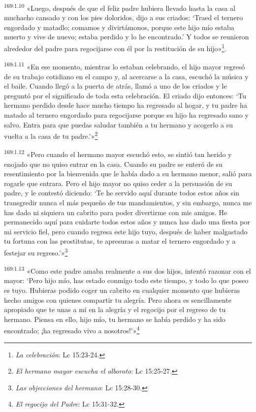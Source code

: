 \par
\textsuperscript{169:1.10} «Luego, después de que el feliz padre hubiera llevado hasta la casa al muchacho cansado y con los pies doloridos, dijo a sus criados: `Traed el ternero engordado y matadlo; comamos y divirtámonos, porque este hijo mío estaba muerto y vive de nuevo; estaba perdido y lo he encontrado.' Y todos se reunieron alrededor del padre para regocijarse con él por la restitución de su hijo»\footnote{\textit{La celebración}: Lc 15:23-24.}.

\par
\textsuperscript{169:1.11} «En ese momento, mientras lo estaban celebrando, el hijo mayor regresó de su trabajo cotidiano en el campo y, al acercarse a la casa, escuchó la música y el baile. Cuando llegó a la puerta de atrás, llamó a uno de los criados y le preguntó por el significado de toda esta celebración. El criado dijo entonces: `Tu hermano perdido desde hace mucho tiempo ha regresado al hogar, y tu padre ha matado al ternero engordado para regocijarse porque su hijo ha regresado sano y salvo. Entra para que puedas saludar también a tu hermano y acogerlo a su vuelta a la casa de tu padre.'»\footnote{\textit{El hermano mayor escucha el alboroto}: Lc 15:25-27.}

\par
\textsuperscript{169:1.12} «Pero cuando el hermano mayor escuchó esto, se sintió tan herido y enojado que no quiso entrar en la casa. Cuando su padre se enteró de su resentimiento por la bienvenida que le había dado a su hermano menor, salió para rogarle que entrara. Pero el hijo mayor no quiso ceder a la persuasión de su padre, y le contestó diciendo: `Te he servido aquí durante todos estos años sin transgredir nunca el más pequeño de tus mandamientos, y sin embargo, nunca me has dado ni siquiera un cabrito para poder divertirme con mis amigos. He permanecido aquí para cuidarte todos estos años y nunca has dado una fiesta por mi servicio fiel, pero cuando regresa este hijo tuyo, después de haber malgastado tu fortuna con las prostitutas, te apresuras a matar el ternero engordado y a festejar su regreso.'»\footnote{\textit{Las objecciones del hermano}: Lc 15:28-30.}

\par
\textsuperscript{169:1.13} «Como este padre amaba realmente a sus dos hijos, intentó razonar con el mayor: `Pero hijo mío, has estado conmigo todo este tiempo, y todo lo que poseo es tuyo. Hubieras podido coger un cabrito en cualquier momento que hubieras hecho amigos con quienes compartir tu alegría. Pero ahora es sencillamente apropiado que te unas a mí en la alegría y el regocijo por el regreso de tu hermano. Piensa en ello, hijo mío, tu hermano se había perdido y ha sido encontrado; ¡ha regresado vivo a nosotros!'»\footnote{\textit{El regocijo del Padre}: Lc 15:31-32.}

